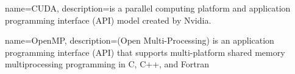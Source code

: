 
{
	name={CUDA},
	description={is a parallel computing platform and application programming interface (API) model created by Nvidia.}
}

{
	name={OpenMP},
	description={(Open Multi-Processing) is an application programming interface (API) that supports multi-platform shared memory multiprocessing programming in C, C++, and Fortran}
}